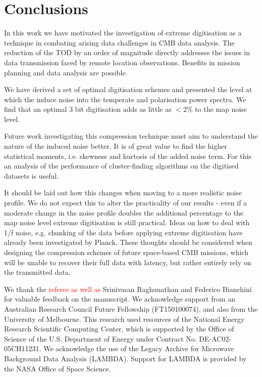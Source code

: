 \documentclass[apj]{emulateapj}
\newcommand{\changed}[1]{\textcolor{Red}{#1}}
\begin{document}
\section{Conclusions}
\label{sec:conclusions}

In this work we have motivated the investigation of extreme digitisation as a technique in combating arising data challenges in CMB data analysis. The reduction of the TOD by an order of magnitude directly addresses the issues in data transmission faced by remote location observations. Benefits in mission planning and data analysis are possible.

We have derived a set of optimal digitisation schemes and presented the level at which the induce noise into the temperate and polarisation power spectra. We find that an optimal 3 bit digitisation adds as little as $<2\%$ to the map noise level.

Future work investigating this compression technique must aim to understand the nature of the induced noise better. It is of great value to find the higher statistical moments, i.e. skewness and kurtosis of the added noise term. For this an analysis of the performance of cluster-finding algorithms on the digitised datasets is useful.

It should be laid out how this changes when moving to a more realistic noise profile. We do not expect this to alter the practicality of our results - even if a moderate change in the noise profile doubles the additional percentage to the map noise level extreme digitisation is still practical. Ideas on how to deal with 1/f noise, e.g. chunking of the data before applying extreme digitisation have already been investigated by Planck. These thoughts should be considered when designing the compression schemes of future space-based CMB missions, which will be unable to recover their full data with latency, but rather entirely rely on the transmitted data.

\acknowledgments %

We thank the \changed{referee as well as} Srinivasan Raghunathan and Federico Bianchini for valuable feedback on the manuscript. 
We acknowledge support from an Australian Research Council Future Fellowship (FT150100074), and also from the University of Melbourne. 
This research used resources of the National Energy Research Scientific Computing Center, which is supported by the Office of Science of the U.S. Department of Energy under Contract No. DE-AC02-05CH11231. 
We acknowledge the use of the Legacy Archive for Microwave Background Data Analysis (LAMBDA). Support for LAMBDA is provided by the NASA Office of Space Science.



\end{document}
